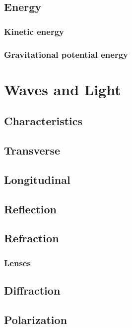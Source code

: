 \documentclass{book}
\begin{document}
\section{Energy}
\subsection{Kinetic energy}

\subsection{Gravitational potential energy}



\chapter{Waves and Light}
\section{Characteristics}


\section{Transverse}


\section{Longitudinal}


\section{Reflection}


\section{Refraction}
\subsection{Lenses}



\section{Diffraction}


\section{Polarization}
\end{document}
